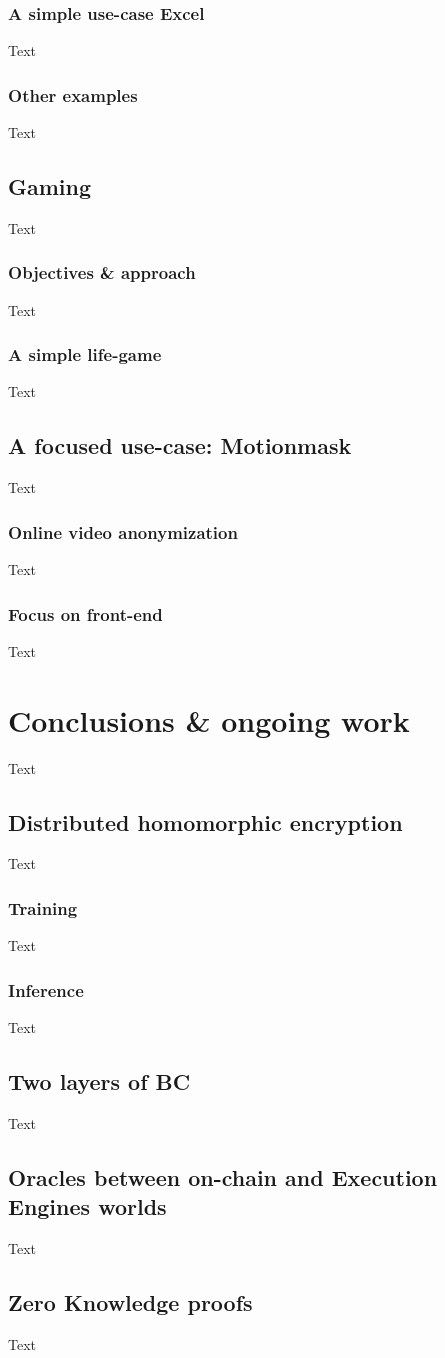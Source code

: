 \documentclass{article}
\begin{document}
\subsubsection{A simple use-case Excel}
Text
\subsubsection{Other examples}
Text

\subsection{Gaming}
Text
\subsubsection{Objectives \& approach}
Text
\subsubsection{A simple life-game}
Text

\subsection{A focused use-case: Motionmask \texttrademark}
Text
\subsubsection{Online video anonymization}
Text
\subsubsection{Focus on front-end}
Text

\section{Conclusions \& ongoing work}
Text
\subsection{Distributed homomorphic encryption}
Text
\subsubsection{Training}
Text
\subsubsection{Inference}
Text

\subsection{Two layers of BC}
Text

\subsection{Oracles between on-chain and Execution Engines worlds}
Text

\subsection{Zero Knowledge proofs}
Text

  
  
\end{document}

